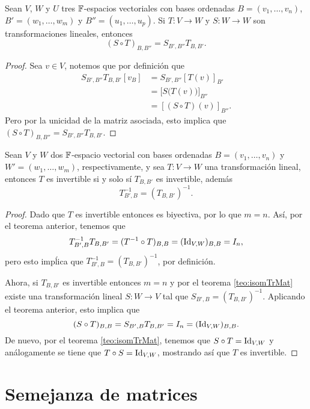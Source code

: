\begin{teor}
  Sean $V$, $W$ y $U$ tres $\mathbb{F}$-espacios vectoriales con bases ordenadas $B = (v_1,\ldots,v_n)$, $B' = (w_1,\ldots,w_m)$ y $B'' = (u_1,\ldots,u_p)$. Si $T\colon V \to W$ y $S\colon W \to W$ son transformaciones lineales, entonces
  \[ (S \circ T)_{B,B''} = S_{B',B''} T_{B,B'}. \]
\end{teor}
\begin{proof}
  Sea $v \in V$, notemos que por definición que
    \begin{align*}
      S_{B',B''} T_{B,B'}[v_B] &= S_{B',B''}[T(v)]_{B'} \\
        &= \bigl[ S\bigl(T(v)\bigr) \bigr]_{B''} \\
        &= [(S\circ T)(v)]_{B''}.
    \end{align*}
  Pero por la unicidad de la matriz asociada, esto implica que $(S \circ T)_{B,B''} = S_{B',B''} T_{B,B'}$.
\end{proof}

\begin{coro}
  Sean $V$ y $W$ dos $\mathbb{F}$-espacio vectorial con bases ordenadas $B = (v_1,\ldots,v_n)$ y $W' = (w_1,\ldots,w_m)$, respectivamente, y sea $T\colon V \to W$ una transformación lineal, entonces $T$ es invertible si y solo sí $T_{B,B'}$ es invertible, además
    \[ T_{B',B}^{-1} = (T_{B,B'})^{-1}. \]
\end{coro}
\begin{proof}
  Dado que $T$ es invertible entonces es biyectiva, por lo que $m = n$. Así, por el teorema anterior, tenemos que
  \[ T^{-1}_{B',B} T_{B,B'} = (T^{-1}\circ T)_{B,B} = (\mathrm{Id}_{V,W})_{B,B} = I_n, \]
  pero esto impĺica que $T_{B',B}^{-1} = (T_{B,B'})^{-1}$, por definición.

  Ahora, si $T_{B,B'}$ es invertible entonces $m = n$ y por el teorema \ref{teo:isomTrMat} existe una transformación lineal $S\colon W \to V$ tal que $S_{B',B} =  (T_{B,B'})^{-1}$. Aplicando el teorema anterior, esto implica que
    \[ (S \circ T)_{B,B} =  S_{B',B}T_{B,B'} = I_n = (\mathrm{Id}_{V,W})_{B,B}. \]
  De nuevo, por el teorema \ref{teo:isomTrMat}, tenemos que $S \circ T = \mathrm{Id}_{V,W}$ y análogamente se tiene que $T \circ S = \mathrm{Id}_{V,W}$, mostrando así que $T$ es invertible.
\end{proof}



\section{Semejanza de matrices}

